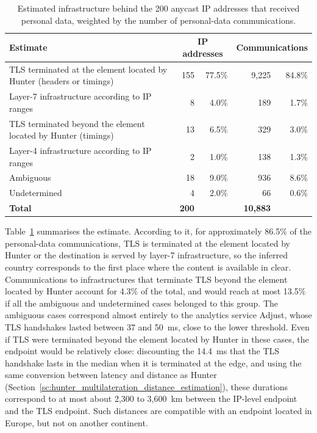\begin{table}[ht]
    \centering
    \small
    \caption{Estimated infrastructure behind the 200 anycast IP addresses that received personal data, weighted by the number of personal-data communications.}
    \label{tab:anycast_experiments_scenarios}
    \begin{tabularx}{\textwidth}{>{\raggedright\arraybackslash}X rr rr}
        \toprule
        \textbf{Estimate} & \multicolumn{2}{c}{\textbf{IP addresses}} & \multicolumn{2}{c}{\textbf{Communications}} \\
        \midrule
        TLS terminated at the element located by Hunter (headers or timings) & 155 & 77.5\% & 9,225 & 84.8\% \\
        \rowsep{5}
        Layer-7 infrastructure according to IP ranges & 8 & 4.0\% & 189 & 1.7\% \\
        \rowsep{5}
        TLS terminated beyond the element located by Hunter (timings) & 13 & 6.5\% & 329 & 3.0\% \\
        \rowsep{5}
        Layer-4 infrastructure according to IP ranges & 2 & 1.0\% & 138 & 1.3\% \\
        \rowsep{5}
        Ambiguous & 18 & 9.0\% & 936 & 8.6\% \\
        \rowsep{5}
        Undetermined & 4 & 2.0\% & 66 & 0.6\% \\
        \midrule
        \textbf{Total} & \textbf{200} & & \textbf{10,883} & \\
        \bottomrule
    \end{tabularx}
\end{table}

Table~\ref{tab:anycast_experiments_scenarios} summarises the estimate. According to it, for approximately 86.5\% of the personal-data communications, TLS is terminated at the element located by Hunter or the destination is served by layer-7 infrastructure, so the inferred country corresponds to the first place where the content is available in clear. Communications to infrastructures that terminate TLS beyond the element located by Hunter account for 4.3\% of the total, and would reach at most 13.5\% if all the ambiguous and undetermined cases belonged to this group. The ambiguous cases correspond almost entirely to the analytics service Adjust, whose TLS handshakes lasted between 37 and 50~ms, close to the lower threshold. Even if TLS were terminated beyond the element located by Hunter in these cases, the endpoint would be relatively close: discounting the 14.4~ms that the TLS handshake lasts in the median when it is terminated at the edge, and using the same conversion between latency and distance as Hunter (Section~\ref{sc:hunter_multilateration_distance_estimation}), these durations correspond to at most about 2,300 to 3,600~km between the IP-level endpoint and the TLS endpoint. Such distances are compatible with an endpoint located in Europe, but not on another continent.

